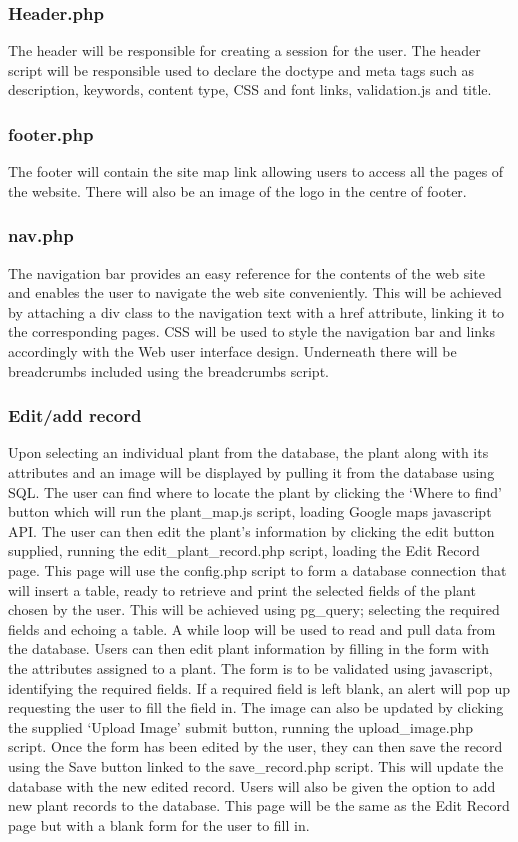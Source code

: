 	\subsubsection{Header.php}
		The header will be responsible for creating a session for the user. The header script will be responsible used to declare the doctype and meta tags such as description, keywords, content type, CSS and font links, validation.js and title. 

	\subsubsection{footer.php}
		The footer will contain the site map link allowing users to access all the pages of the website. There will also be an image of the logo in the centre of footer.

	\subsubsection{nav.php}
		The navigation bar provides an easy reference for the contents of the web site and enables the user to navigate the web site conveniently. This will be achieved by attaching a div class to the navigation text with a href attribute, linking it to the corresponding pages. CSS will be used to style the navigation bar and links accordingly with the Web user interface design. Underneath there will be breadcrumbs included using the breadcrumbs script.

	\subsubsection{Edit/add record}
		Upon selecting an individual plant from the database, the plant along with its attributes and an image will be displayed by pulling it from the database using SQL. The user can find where to locate the plant by clicking the ‘Where to find’ button which will run the plant\_map.js script, loading Google maps javascript API. The user can then edit the plant’s information by clicking the edit button supplied, running the edit\_plant\_record.php script, loading the Edit Record page. This page will use the config.php script to form a database connection that will insert a table, ready to retrieve and print the selected fields of the plant chosen by the user. This will be achieved using pg\_query; selecting the required fields and echoing a table. A while loop will be used to read and  pull data from the database. Users can then edit plant information by filling in the form with the attributes assigned to a plant. The form is to be validated using javascript, identifying the required fields. If a required field is left blank, an alert will pop up requesting the user to fill the field in. The image can also be updated by clicking the supplied ‘Upload Image’ submit button, running the upload\_image.php script. Once the form has been edited by the user, they can then save the record using the Save button linked to the save\_record.php script. This will update the database with the new edited record. Users will also be given the option to add new plant records to the database. This page will be the same as the Edit Record page but with a blank form for the user to fill in.

